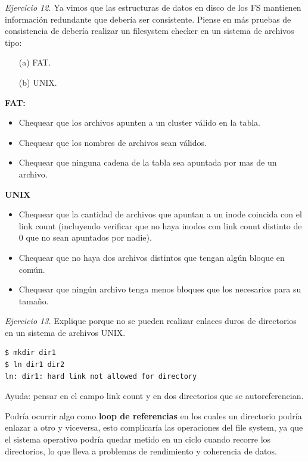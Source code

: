 \documentclass[12pt]{article}
\begin{document}
\noindent \textit{Ejercicio 12.} Ya vimos que las estructuras de datos en disco de los FS mantienen información redundante que debería ser consistente. Piense en más pruebas de consistencia de debería realizar un filesystem checker en un sistema de archivos tipo:

\begin{itemize}
    \item[(a)] FAT.
    \item[(b)] UNIX.
\end{itemize}

\begin{rta}
    \textbf{FAT:}
    \begin{itemize}
        \item Chequear que los archivos apunten a un cluster válido en la tabla.
        \item Chequear que los nombres de archivos sean válidos.
        \item Chequear que ninguna cadena de la tabla sea apuntada por mas de un archivo.
    \end{itemize}
    \textbf{UNIX}
    \begin{itemize}
        \item Chequear que la cantidad de archivos que apuntan a un inode coincida con el link count (incluyendo verificar que no haya inodos con link count distinto de 0 que no sean apuntados por nadie).
        \item Chequear que no haya dos archivos distintos que tengan algún bloque en común.
        \item Chequear que ningún archivo tenga menos bloques que los necesarios para su tamaño.
    \end{itemize}
\end{rta}

\noindent \textit{Ejercicio 13.} Explique porque no se pueden realizar enlaces duros de directorios en un sistema de archivos UNIX.

\begin{lstlisting}[style=BashStyle]
$ mkdir dir1
$ ln dir1 dir2
ln: dir1: hard link not allowed for directory
\end{lstlisting}

Ayuda: pensar en el campo link count y en dos directorios que se autoreferencian.

\begin{rta}
    Podría ocurrir algo como \textbf{loop de referencias} en los cuales un directorio podría enlazar a otro y viceversa, esto complicaría las operaciones del file system, ya que el sistema operativo podría quedar metido en un ciclo cuando recorre los directorios, lo que lleva a problemas de rendimiento y coherencia de datos.
\end{rta}
\end{document}
